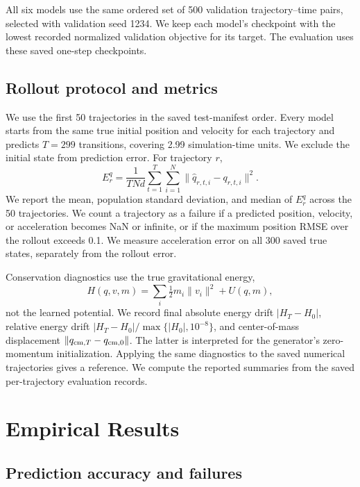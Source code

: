 \documentclass[10pt,letterpaper,twocolumn]{article}
\newcommand{\norm}[1]{\lVert #1\rVert}
\numberwithin{equation}{section}
\begin{document}
All six models use the same ordered set of 500 validation trajectory--time pairs, selected with
validation seed 1234. We keep each model's checkpoint with the lowest recorded normalized
validation objective for its target. The evaluation uses these saved one-step checkpoints.

\subsection{Rollout protocol and metrics}
\label{sec:eval}

We use the first 50 trajectories in the saved test-manifest order. Every model starts from the same
true initial position and velocity for each trajectory and predicts $T=299$ transitions, covering
2.99 simulation-time units. We exclude the initial state from prediction error. For trajectory $r$,
\begin{equation}
E_r^q=\frac{1}{TNd}\sum_{t=1}^{T}\sum_{i=1}^{N}
\norm{\widehat q_{r,t,i}-q_{r,t,i}}^2.
\label{eq:mse}
\end{equation}
We report the mean, population standard deviation, and median of $E_r^q$ across the 50 trajectories.
We count a trajectory as a failure if a predicted position, velocity, or acceleration becomes NaN
or infinite, or if the maximum position RMSE over the rollout exceeds 0.1. We measure acceleration error on all 300 saved true
states, separately from the rollout error.

Conservation diagnostics use the true gravitational energy,
\begin{equation}
H(q,v,m)=\sum_i\tfrac12m_i\norm{v_i}^2+U(q,m),
\label{eq:trueenergy}
\end{equation}
not the learned potential. We record final absolute energy drift $|H_T-H_0|$, relative energy drift
$|H_T-H_0|/\max\{|H_0|,10^{-8}\}$, and center-of-mass displacement
$\norm{q_{{\rm cm},T}-q_{{\rm cm},0}}$. The latter is interpreted for the generator's zero-momentum
initialization. Applying the same diagnostics to the saved numerical trajectories gives a reference. We compute the reported summaries from the saved per-trajectory
evaluation records.

\section{Empirical Results}
\label{sec:results}

\subsection{Prediction accuracy and failures}
\end{document}
